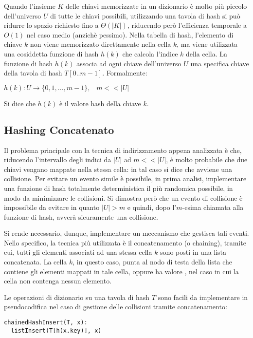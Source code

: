 Quando l'insieme \(K\) delle chiavi memorizzate in un dizionario è molto più piccolo dell'universo \(U\) di tutte le chiavi possibili, utilizzando una tavola di hash si può ridurre lo spazio richiesto fino a \(\Theta(|K|)\), riducendo però l'efficienza temporale a \(O(1)\) nel caso medio (anzichè pessimo). Nella tabella di hash, l'elemento di chiave \(k\) non viene memorizzato direttamente nella cella \(k\), ma viene utilizzata una cosiddetta funzione di hash \(h(k)\) che calcola l'indice \(k\) della cella. La funzione di hash \(h(k)\) associa ad ogni chiave dell'universo \(U\) una specifica chiave della tavola di hash \(T[0..m-1]\). Formalmente:

\(h(k):U\to \{0,1,..., m-1\},\;\;\; m<<|U|\)

Si dice che \(h(k)\) è il valore hash della chiave \(k\).

\subsection{Hashing Concatenato}

Il problema principale con la tecnica di indirizzamento appena analizzata è che, riducendo l'intervallo degli indici da \(|U|\) ad \(m<<|U|\), è molto probabile che due chiavi vengano mappate nella stessa cella: in tal caso si dice che avviene una collisione. Per evitare un evento simile è possibile, in prima analisi, implementare una funzione di hash totalmente deterministica il più randomica possibile, in modo da minimizzare le collisioni. Si dimostra però che un evento di collisione è impossibile da evitare in quanto \(|U| > m\) e quindi, dopo l'\(m\)-esima chiamata alla funzione di hash, avverà sicuramente una collisione. 

Si rende necessario, dunque, implementare un meccanismo che gestisca tali eventi. Nello specifico, la tecnica più utilizzata è il concatenamento (o chaining), tramite cui, tutti gli elementi associati ad una stessa cella \(k\) sono posti in una lista concatenata. La cella \(k\), in questo caso, punta al nodo di testa della lista che contiene gli elementi mappati in tale cella, oppure ha valore , nel caso in cui la cella non contenga nessun elemento. 

Le operazioni di dizionario su una tavola di hash \(T\) sono facili da implementare in pseudocodifica nel caso di gestione delle collisioni tramite concatenamento:

\begin{lstlisting}
chainedHashInsert(T, x):
  listInsert(T[h(x.key)], x)
\end{lstlisting}

